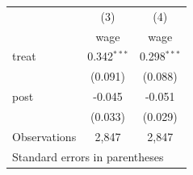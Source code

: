 \begin{tabular}{lcc}
\toprule
 & (3) & (4) \\
 & wage & wage \\
\midrule
treat & 0.342$^{***}$ & 0.298$^{***}$ \\
      & (0.091) & (0.088) \\
post  & -0.045 & -0.051 \\
      & (0.033) & (0.029) \\
Observations & 2,847 & 2,847 \\
\bottomrule
\multicolumn{3}{l}{\footnotesize Standard errors in parentheses} \\
\end{tabular}
